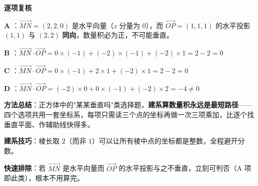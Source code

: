 \begin{answer}
\par\medskip

\textbf{逐项复核}

\textbf{A }：$\overrightarrow{MN}=(2,2,0)$ 是水平向量（$z$ 分量为 $0$），而 $\overrightarrow{OP}=(1,1,1)$ 的水平投影 $(1,1)$ 与 $(2,2)$ \textbf{同向}，数量积必为正，不可能垂直。

\textbf{B }：$\overrightarrow{MN}\cdot\overrightarrow{OP}=0\times(-1)+(-2)\times(-1)+(-2)\times1=2-2=0$ 

\textbf{C }：$\overrightarrow{MN}\cdot\overrightarrow{OP}=0\times(-1)+2\times1+(-2)\times1=2-2=0$ 

\textbf{D }：$\overrightarrow{MN}\cdot\overrightarrow{OP}=(-2)\times0+0\times(-1)+(-2)\times2=-4\ne0$ 

\begin{gktip}
\textbf{方法总结}：正方体中的"某某垂直吗"类选择题，\textbf{建系算数量积永远是最短路径}——四个选项共用一套坐标系，每项只需读三个点的坐标再做一次三项乘加，比逐个找垂直平面、作辅助线快得多。

\textbf{建系技巧}：棱长取 $2$（而非 $1$）可以让所有棱中点的坐标都是整数，全程避开分数。

\textbf{快速排除}：若 $\overrightarrow{MN}$ 是水平向量而 $\overrightarrow{OP}$ 的水平投影与之不垂直，立刻可判否（A 项即此类），根本不用算完。
\end{gktip}


\par\medskip

\end{answer}
